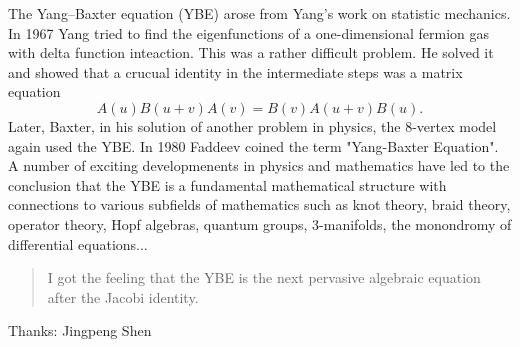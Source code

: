 
The Yang--Baxter equation (YBE) arose from Yang's work on statistic mechanics. In 1967 Yang tried to find the eigenfunctions of a one-dimensional fermion gas with delta function inteaction. This was
a rather difficult problem. He solved it and showed that a crucual identity in the intermediate steps was a matrix equation
\[
A(u)B(u+v)A(v)=B(v)A(u+v)B(u).
\]
Later, Baxter, in his solution of another problem in physics, the 8-vertex model again used the YBE. 
In 1980 Faddeev coined the term "Yang-Baxter Equation". A number of exciting developmenents in 
physics and mathematics have led to the conclusion that the YBE is a fundamental mathematical structure with connections to various subfields of mathematics such as 
knot theory, braid theory, operator theory, Hopf algebras, quantum groups, 3-manifolds, the monondromy of differential equations...

\begin{quote}
    I got the feeling that the YBE is the next pervasive algebraic equation after the Jacobi identity.
\end{quote}


Thanks: Jingpeng Shen
